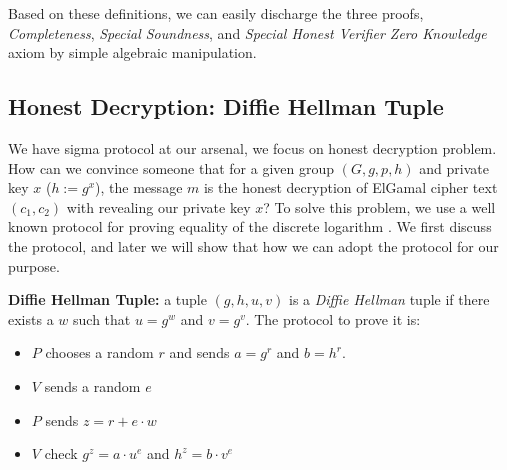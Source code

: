 \begin{displayquote}

$\text{initial r := } g^r}$  

$\text{challenge := } e$

$\text{response h w r e := } r + e \cdot w$

$\text{verify h a e z  := } g^z = a \cdot h^e$

$\text{simulator s e z := } (g^z \cdot h^{-e}, e, z)$

$\text{extractor }  $c_{1}$ $z_{1}$ $c_{2}$ $z_{2}$ := (z_{1} - z_{2}) \cdot (c_{2} - c_{1})^{-1}$

\end{displayquote}

Based on these definitions, we can easily discharge the three proofs, \textit{Completeness}, 
\textit{Special Soundness}, and \textit{Special Honest Verifier Zero Knowledge} axiom by simple 
algebraic manipulation.

\subsection{Honest Decryption: Diffie Hellman Tuple}
\label{sec:dec_sigma}
We have sigma protocol at our arsenal, we focus on honest decryption 
problem. How can we convince someone that for a given group 
$(G, g, p, h)$ and private key $x$ ($h := g^x$), the message $m$ is the 
honest decryption of ElGamal cipher text $(c_{1}, c_{2})$ with revealing 
our private key $x$? To solve this problem, we use a well known protocol
for proving equality of the discrete logarithm \citep{10.1007/3-540-69053-0_9}.
We first discuss the protocol, and later we will show that how we can adopt 
the protocol for our purpose. 

\textbf{Diffie Hellman Tuple:} a tuple $(g, h, u, v)$ is 
 a \textit{Diffie Hellman} tuple if there exists a $w$ such that 
 $u = g^w$ and $v = g^v$.  The protocol to prove it is:
 
 \begin{itemize}
 \item $P$ chooses a random $r$ and sends $a=g^r$ and $b = h^r$.
 \item $V$ sends a random $e$
 \item $P$ sends $z =r+ e \cdot w$
 \item $V$ check $g^z = a \cdot u^e$ and $h^z = b\cdot v^e$ 
 \end{itemize}
 


